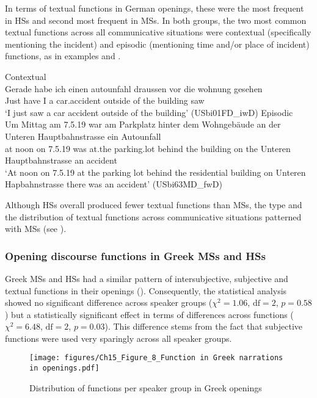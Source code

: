 \documentclass[output=paper,colorlinks,citecolor=brown]{langscibook}
\begin{document}
In terms of textual functions in German openings, these were the most frequent in HSs and second most frequent in MSs. In both groups, the two most common textual functions across all communicative situations were contextual (specifically mentioning the incident) and episodic (mentioning time and/or place of incident) functions, as in examples  and . 

\ea Contextual\\ \label{katsikaetal:thirtytwocontextual}
\gll Gerade habe ich einen autounfahl   draussen vor die wohnung  gesehen\\
     Just   have I   a     car.accident outside  of  the building saw\\
\glt `I just saw a car accident outside of the building' (USbi01FD\_iwD)
\newpage
\ex Episodic\\ \label{katsikaetal:thirtythreeepisodic}
\gll Um Mittag am 7.5.19 war am     Parkplatz   hinter dem    Wohngebäude an der Unteren Hauptbahnstrasse ein Autounfall\\
     at noon   on 7.5.19 was at.the parking.lot behind the building on the Unteren Hauptbahnstrasse an accident\\
\glt `At noon on 7.5.19 at the parking lot behind the residential building on Unteren Hapbahnstrasse there was an accident' (USbi63MD\_fwD)
\z

Although HSs overall produced fewer textual functions than MSs, the type and the distribution of textual functions across communicative situations patterned with MSs (see ).  

\subsubsection{Opening discourse functions in Greek MSs and HSs}
Greek MSs and HSs had a similar pattern of intersubjective, subjective and textual functions in their openings (). Consequently, the statistical analysis showed no significant difference across speaker groups ($\chi^2= 1.06$, $\text{df} = 2$, $p = 0.58$) but a statistically significant effect in terms of differences across functions ($\chi^2 = 6.48$, $\text{df} = 2$, $p = 0.03$). This difference stems from the fact that subjective functions were used very sparingly across all speaker groups. 

\begin{figure}
    \texttt{[image: figures/Ch15\_Figure\_8\_Function in Greek narrations in openings.pdf]}
    \caption{Distribution of functions per speaker group in Greek openings}
    \label{fig:katsikaetal:Greekfunctionsopenings}
\end{figure}
\end{document}
